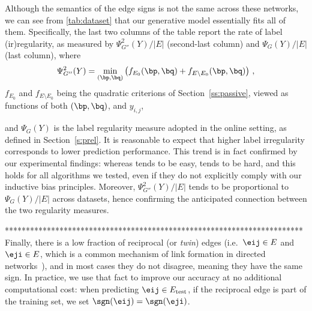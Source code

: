Although the semantics of the edge signs is not the same across these networks, we can see from \autoref{tab:dataset} that our generative model essentially fits all of them. Specifically, the last two columns of the table report the rate of label (ir)regularity, as measured by $\Psi^2_{G''}(Y)/|E|$ (second-last column) and $\Psi_{G}(Y)/|E|$ (last column), where 
\[
\Psi^2_{G''}(Y) = \min_{(\bp,\bq)} \left(f_{E_0}(\bp,\bq) + f_{E\setminus E_0}(\bp,\bq)\right)\,,
\]
%
$f_{E_0}$ and $f_{E\setminus E_0}$ being the quadratic criterions of Section~\ref{ss:passive}, viewed as functions of both $(\bp,\bq)$, and $y_{i,j}$,
\iffalse
*****************
\[
\Psi_{G''}(Y) = \min_{\bp,\bq\in[0,1]^{|V|}}
\sum_{(i,j) \in E} \left(\frac{1+y_{i,j}}{2} - \frac{p_i+q_j}{2}\right)^2\,,
\]
i.e., the quadratic criterion $f_{E}(\bp,\bq)$ of Section~\ref{ss:passive} when all labels are known,
*****************
\fi
and $\Psi_{G}(Y)$ is the label regularity measure adopted in the online setting, as defined in Section~\ref{s:prel}. 
It is reasonable to expect that higher label irregularity corresponds to lower prediction performance. This trend is in fact confirmed by our experimental findings: whereas \epi{} tends to be easy, \aut{} tends to be hard, and this holds for all algorithms we tested, even if they do not explicitly comply with our inductive bias principles. Moreover, $\Psi^2_{G''}(Y)/|E|$ tends to be proportional to $\Psi_{G}(Y)/|E|$ across datasets, hence confirming the anticipated connection between the two regularity measures.






%
%


\iffalse
***********************************************************************
Finally, there is a low fraction of reciprocal (or \emph{twin}) edges (i.e.\
$\eij \in E$ and $\eji \in E$, which is a common mechanism of link formation in
directed networks~\cite{DirectedReciprocity04}), and in most cases they do not
disagree, meaning they have the same sign. In practice, we use that fact to
improve our accuracy at no additional computational cost: when predicting $\eij
\in E_{\mathrm{test}}$, if the reciprocal edge \eji{} is part of the training set, we
set $\sgn(\eij) = \sgn(\eji)$.

